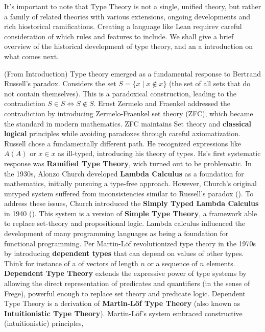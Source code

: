 It's important to note that Type Theory is not a single, unified theory, but rather a family of 
related theories with various extensions, ongoing developments and rich hiostorical ramifications. 
Creating a language like Lean requirev careful consideration of which rules and features to include.
We shall give a brief overview of the historical development of type theory, and an a introduction on 
what comes next.

(From \cite{carneiro2019typetheorylean} Introduction)
Type theory emerged as a fundamental response to Bertrand Russell's paradox. 
Considers the set $S = \{x \mid x \notin x\}$ 
(the set of all sets that do not contain themselves). This is a paradoxical construction, 
leading to the contradiction $S \in S \iff S \notin S$. 
Ernst Zermelo and Fraenkel addressed the contradiction by introducing Zermelo-Fraenkel set theory (ZFC), 
which became the standard in modern mathematics. 
ZFC maintains Set theory and \textbf{classical logical} principles while avoiding paradoxes through careful axiomatization.
Russell chose a fundamentally different path. He recognized expressions 
like $A(A)$ or $x \in x$ as ill-typed, introducing his theory of types.
Hs's first systematic response was \textbf{Ramified Type Theory}, wich turned out to be problematic.
In the 1930s, Alonzo Church developed \textbf{Lambda Calculus} as a foundation for mathematics, 
initially pursuing a type-free approach. However, Church's original untyped system suffered from 
inconsistencies similar to Russell's paradox (\cite{wadler2015propositions}). 
To address these issues, 
Church introduced the \textbf{Simply Typed Lambda Calculus} in 1940 (\cite{church1940formulation}).  
This system is a version of \textbf{Simple Type Theory}, a framework able to replace 
set-theory and propositional logic.
Lambda calculus influenced the development of many programming languages as being a foundation for
functional programming.
Per Martin-L\"{o}f revolutionized type theory in the 1970s by introducing 
\textbf{dependent types} that can depend on values of other types.
Think for instance of a of vectors of length $n$ or a sequence of $n$ elements.
\textbf{Dependent Type Theory} extends the expressive power of type systems by allowing the 
direct representation of predicates and quantifiers (in the sense of Frege), 
powerful enough to replace set theory and predicate logic.
Dependent Type Theory is a derivation of \textbf{Martin-L\"{o}f Type Theory} 
(also known as \textbf{Intuitionistic Type Theory}).
Martin-L\"{o}f's system embraced constructive (intuitionistic) principles, 
